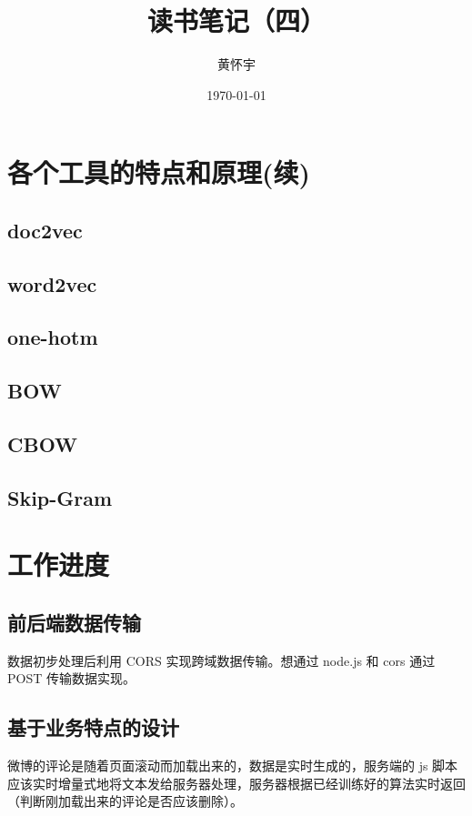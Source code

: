 \documentclass[UTF8]{ctexart}
\title{读书笔记（四）}
\author{黄怀宇}
\date{\today}
\begin{document}
\maketitle

\section{各个工具的特点和原理(续)}

\subsection{doc2vec}

\subsection{word2vec}

\subsection{one-hotm}

\subsection{BOW}

\subsection{CBOW}

\subsection{Skip-Gram}

\section{工作进度}
\subsection{前后端数据传输}
数据初步处理后利用 CORS 实现跨域数据传输。想通过 node.js 和 cors 通过 POST 传输数据实现。
\subsection{基于业务特点的设计}
微博的评论是随着页面滚动而加载出来的，数据是实时生成的，服务端的 js 脚本应该实时增量式地将文本发给服务器处理，服务器根据已经训练好的算法实时返回（判断刚加载出来的评论是否应该删除）。
\end{document}

